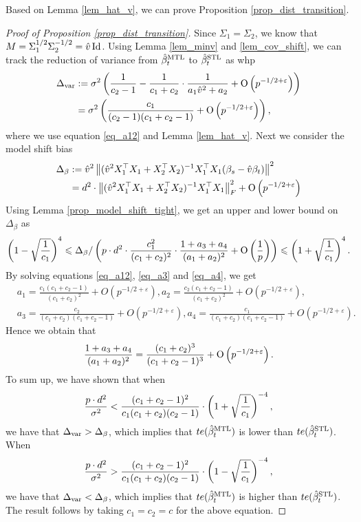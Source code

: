 Based on Lemma \ref{lem_hat_v}, we can prove Proposition \ref{prop_dist_transition}.
\begin{proof}[Proof of Proposition \ref{prop_dist_transition}]
	Since $\Sigma_1 = \Sigma_2$, we know that $M = \Sigma_1^{1/2}\Sigma_2^{-1/2} = \hat{v} \operatorname{Id}$.
	Using Lemma \ref{lem_minv} and \ref{lem_cov_shift}, we can track the reduction of variance from $\hat{\beta}_t^{\text{MTL}}$ to $\hat{\beta}_t^{\text{STL}}$ as whp
	\begin{align*}
		\Delta_{\text{var}} &:= \sigma^2 \left({\frac{1}{c_2 - 1} - \frac{1}{c_1 + c_2}\cdot\frac{1}{a_1\hat{v}^2 + a_2} + \operatorname{O}\left(p^{-1/2+\varepsilon}\right)}\right) \\
		&= \sigma^2 \left({\frac{c_1}{(c_2-1)(c_1 + c_2 -1)} + \operatorname{O}\left(p^{-1/2 + \varepsilon}\right)}\right),
	\end{align*}
	where we use equation \eqref{eq_a12} and Lemma \ref{lem_hat_v}.
	Next we consider the model shift bias
	\begin{align*}
		\Delta_{\beta} &:= \hat{v}^2 \left\| (\hat{v}^2 X_1^{\top}X_1 + X_2^{\top}X_2)^{-1} X_1^{\top}X_1 (\beta_s - \hat{v}\beta_t) \right\|^2 \\
		&= d^2 \cdot \left\| (\hat{v}^2 X_1^{\top}X_1 + X_2^{\top}X_2)^{-1}X_1^{\top}X_1 \right\|_{F}^2 + \operatorname{O}\left(p^{-1/2 + \varepsilon}\right)
	\end{align*}
	Using Lemma \ref{prop_model_shift_tight}, we get an upper and lower bound on $\Delta_{\beta}$ as
	\[ \left({1 - \sqrt{\frac{1}{c_1}}}\right)^4 \leqslant \Delta_{\beta} / \left({p\cdot d^2 \cdot \frac{c_1^2}{(c_1+c_2)^2} \cdot \frac{1 + a_3 + a_4}{(a_1 + a_2)^2} + \operatorname{O}\left(\frac 1 p\right) }\right) \leqslant \left({1 + \sqrt{\frac{1}{c_1}}}\right)^4. \]
	By solving equations \eqref{eq_a12}, \eqref{eq_a3} and \eqref{eq_a4}, we get
	\begin{align*}
		& a_1 = \frac{c_1(c_1 + c_2 - 1)}{(c_1 + c_2)^2} + O(p^{-1/2 + \varepsilon}),
		a_2 = \frac{c_2(c_1 + c_2 - 1)}{(c_1 + c_2)^2} + O(p^{-1/2 + \varepsilon}), \\
		& a_3 = \frac{c_2}{(c_1 + c_2)(c_1 + c_2 - 1)} + O(p^{-1/2 + \varepsilon}),
		a_4 = \frac{c_1}{(c_1 + c_2)(c_1 + c_2 - 1)} + O(p^{-1/2 + \varepsilon}).
	\end{align*}
	Hence we obtain that
	\begin{align*}
		\frac{1 + a_3 + a_4}{(a_1 + a_2)^2}
		= \frac{(c_1 + c_2)^3}{(c_1 + c_2 - 1)^3} + \operatorname{O}\left(p^{-1/2+\varepsilon}\right).
	\end{align*}
	To sum up, we have shown that when
	\[ \frac{p\cdot d^2}{\sigma^2} < \frac{(c_1 + c_2 - 1)^2}{c_1(c_1 + c_2) (c_2 - 1)} \cdot \left({1 + \sqrt{\frac 1 {c_1}}}\right)^{-4}, \]
	we have that $\Delta_{\text{var}} > \Delta_{\beta}$, which implies that $te(\hat{\beta}_t^{\text{MTL}})$ is lower than $te(\hat{\beta}_t^{\text{STL}})$.
	When
	\[ \frac{p\cdot d^2}{\sigma^2} > \frac{(c_1 + c_2 - 1)^2}{c_1 (c_1 + c_2) (c_2 - 1)} \cdot \left({1 - \sqrt{\frac 1 {c_1}}}\right)^{-4}, \]
	we have that $\Delta_{\text{var}} < \Delta_{\beta}$, which implies that $te(\hat{\beta}_t^{\text{MTL}})$ is higher than $te(\hat{\beta}_t^{\text{STL}})$.
	The result follows by taking $c_1 = c_2 = c$ for the above equation.
\end{proof}


